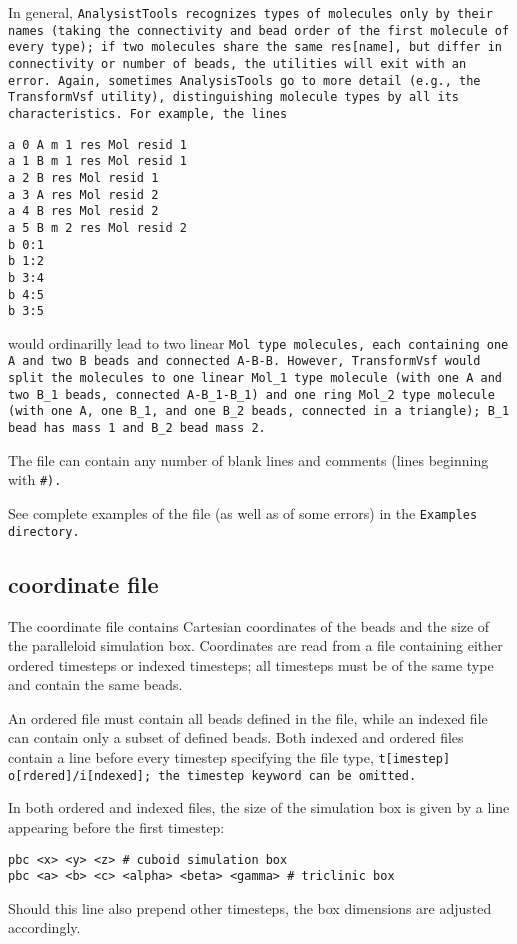 In general, \tt{AnalysistTools} recognizes types of molecules only by their
names (taking the connectivity and bead order of the first molecule of
every type); if two molecules share the same \tt{res[name]}, but differ in
connectivity or number of beads, the utilities will exit with an error.
Again, sometimes \tt{AnalysisTools} go to more detail (e.g., the
\tt{TransformVsf} utility), distinguishing molecule types by all its
characteristics. For example, the lines
%
\begin{lstlisting}
a 0 A m 1 res Mol resid 1
a 1 B m 1 res Mol resid 1
a 2 B res Mol resid 1
a 3 A res Mol resid 2
a 4 B res Mol resid 2
a 5 B m 2 res Mol resid 2
b 0:1
b 1:2
b 3:4
b 4:5
b 3:5
\end{lstlisting}
%
would ordinarilly lead to two linear \tt{Mol} type molecules, each
containing one \tt{A} and two \tt{B} beads and connected \tt{A-B-B}.
However, \tt{TransformVsf} would split the molecules to one linear
\tt{Mol\_1} type molecule (with one \tt{A} and two \tt{B\_1} beads,
connected \tt{A-B\_1-B\_1}) and one ring \tt{Mol\_2} type molecule (with
one \tt{A}, one \tt{B\_1}, and one \tt{B\_2} beads, connected in a
triangle); \tt{B\_1} bead has mass 1 and \tt{B\_2} bead mass 2.

The \vsf file can contain any number of blank lines and comments (lines
beginning with \tt{\#}).

See complete examples of the \vsf file (as well as of some errors) in the
\tt{Examples} directory.

\subsection{\vcf coordinate file} \label{ssec:CoordinateVcf}

The coordinate file contains Cartesian coordinates of the beads and the
size of the paralleloid simulation box. Coordinates are read from a \vcf
file containing either ordered timesteps or indexed timesteps; all
timesteps must be of the same type and contain the same beads.

An ordered \vcf file must contain all beads defined in the \vsf file, while
an indexed \vcf file can contain only a subset of defined beads. Both
indexed and ordered \vcf files contain a line before every timestep
specifying the file type, \tt{t[imestep] o[rdered]/i[ndexed]}; the
\tt{timestep} keyword can be omitted.

In both ordered and indexed \vcf files, the size of the simulation box is
given by a line appearing before the first timestep:
%
\begin{lstlisting}
pbc <x> <y> <z> # cuboid simulation box
pbc <a> <b> <c> <alpha> <beta> <gamma> # triclinic box
\end{lstlisting}
%
Should this line also prepend other timesteps, the box dimensions are
adjusted accordingly.

